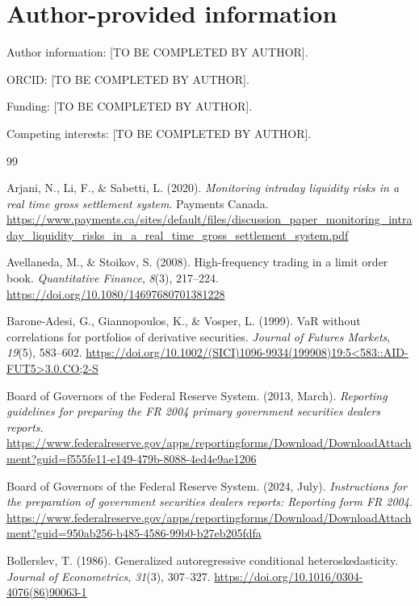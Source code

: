\documentclass[11pt,a4paper]{article}
\begin{document}
\section*{Author-provided information}
Author information: [TO BE COMPLETED BY AUTHOR].\par
ORCID: [TO BE COMPLETED BY AUTHOR].\par
Funding: [TO BE COMPLETED BY AUTHOR].\par
Competing interests: [TO BE COMPLETED BY AUTHOR].\par

\begin{thebibliography}{99}
\raggedright
{} Arjani, N., Li, F., \& Sabetti, L. (2020). \emph{Monitoring intraday liquidity risks in a real time gross settlement system}. Payments Canada. \url{https://www.payments.ca/sites/default/files/discussion_paper_monitoring_intraday_liquidity_risks_in_a_real_time_gross_settlement_system.pdf}

 Avellaneda, M., \& Stoikov, S. (2008). High-frequency trading in a limit order book. \emph{Quantitative Finance}, \emph{8}(3), 217--224. \url{https://doi.org/10.1080/14697680701381228}

 Barone-Adesi, G., Giannopoulos, K., \& Vosper, L. (1999). VaR without correlations for portfolios of derivative securities. \emph{Journal of Futures Markets}, \emph{19}(5), 583--602. \url{https://doi.org/10.1002/(SICI)1096-9934(199908)19:5<583::AID-FUT5>3.0.CO;2-S}

 Board of Governors of the Federal Reserve System. (2013, March). \emph{Reporting guidelines for preparing the FR 2004 primary government securities dealers reports}. \url{https://www.federalreserve.gov/apps/reportingforms/Download/DownloadAttachment?guid=f555fe11-e149-479b-8088-4ed4e9ae1206}

 Board of Governors of the Federal Reserve System. (2024, July). \emph{Instructions for the preparation of government securities dealers reports: Reporting form FR 2004}. \url{https://www.federalreserve.gov/apps/reportingforms/Download/DownloadAttachment?guid=950ab256-b485-4586-99b0-b27eb205fdfa}

 Bollerslev, T. (1986). Generalized autoregressive conditional heteroskedasticity. \emph{Journal of Econometrics}, \emph{31}(3), 307--327. \url{https://doi.org/10.1016/0304-4076(86)90063-1}


\end{thebibliography}
\end{document}
